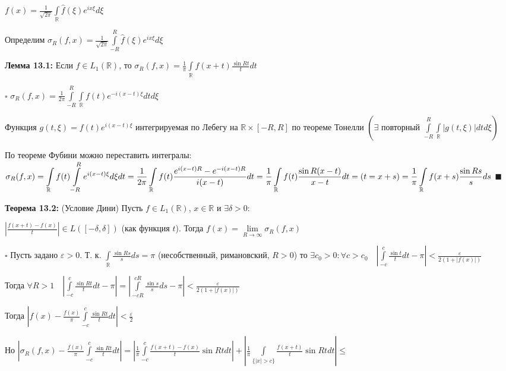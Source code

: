 \documentclass[a4paper]{report}
\newcommand*{\hm}[1]{#1\nobreak\discretionary{}%
            {\hbox{$\mathsurround=0pt #1$}}{}}
\begin{document}
$f(x)=\displaystyle\frac1{\sqrt{2\pi}}\displaystyle\int\limits_{\mathbb R}\hat f(\xi)e^{ix\xi}d\xi$
\bigskip

Определим $\sigma_R(f,x)=\displaystyle\frac{1}{\sqrt{2\pi}}\displaystyle\int\limits_{-R}^R\hat f(\xi)e^{ix\xi}d\xi$

\noindent\textbf{Лемма 13.1:} Если $f\in L_1(\mathbb R)$, то $\sigma_R(f,x)=\displaystyle\frac1\pi\displaystyle\int\limits_{\mathbb R}f(x+t)\frac{\sin Rt}{t}dt$

\noindent $\square$ $\sigma_R(f,x)=\displaystyle\frac1{2\pi}\displaystyle\int\limits_{-R}^R\displaystyle\int\limits_{\mathbb R}f(t)e^{-i(x-t)\xi}dtd\xi$

Функция $g(t,\xi)=f(t)e^{i(x-t)\xi}$ интегрируемая по Лебегу на $\mathbb R\times[-R,R]$ по теореме Тонелли $\left(\exists\text{ повторный }\displaystyle\int\limits_{-R}^R\displaystyle\int\limits_{\mathbb R}|g(t,\xi)|dtd\xi\right)$

По теореме Фубини можно переставить интегралы: $\sigma_R(f,x)=\displaystyle\int\limits_{\mathbb R}f(t)\displaystyle\int\limits_{-R}^R e^{i(x-t)\xi}d\xi dt\hm=\frac1{2\pi}\displaystyle\int\limits_{\mathbb R}f(t)\frac{e^{i(x-t)R}-e^{-i(x-t)R}}{i(x-t)}dt=\frac1\pi\displaystyle\int\limits_{\mathbb R}f(t)\frac{\sin R(x-t)}{x-t}dt=(t=x+s)\hm=\frac1\pi\displaystyle\int\limits_{\mathbb R}f(x+s)\frac{\sin Rs}{s}ds$ $\blacksquare$
\bigskip

\noindent\textbf{Теорема 13.2:} (Условие Дини) Пусть $f\in L_1(\mathbb R)$, $x\in\mathbb R$ и $\exists\delta>0\colon$ 

$\left|\displaystyle\frac{f(x+t)-f(x)}{t}\right|\in L([-\delta,\delta])$ (как функция $t$). Тогда $f(x)=\lim\limits_{R\to\infty}\sigma_R(f,x)$

\noindent $\square$ Пусть задано $\varepsilon>0$. Т. к. $\displaystyle\int\limits_{\mathbb R}\frac{\sin Rs}{s}ds=\pi$ (несобственный, римановский, $R>0$) то $\exists c_0>0\colon\forall c>c_0\quad\left|\displaystyle\int\limits_{-c}^c\frac{\sin t}{t}dt-\pi\right|<\displaystyle\frac{\varepsilon}{2(1+|f(x)|)}$

Тогда $\forall R>1\quad\left|\displaystyle\int\limits_{-c}^c\displaystyle\frac{\sin Rt}{t}dt-\pi\right|=\left|\displaystyle\int\limits_{-cR}^{cR}\frac{\sin s}{s}ds-\pi\right|<\displaystyle\frac{\varepsilon}{2(1+|f(x)|)}$

Тогда $\left|f(x)-\displaystyle\frac{f(x)}{\pi}\displaystyle\int\limits_{-c}^c\frac{\sin Rt}{t}dt\right|<\displaystyle\frac\varepsilon2$

Но $\left|\sigma_R(f,x)-\displaystyle\frac{f(x)}{\pi}\displaystyle\int\limits_{-c}^c\frac{\sin Rt}{t}dt\right|=\left|\displaystyle\frac1\pi\displaystyle\int\limits_{-c}^c\frac{f(x+t)-f(x)}{t}\sin Rtdt\right|+\left|\displaystyle\frac1\pi\displaystyle\int\limits_{\{|x|>c\}}\frac{f(x+t)}{t}\sin Rtdt\right|\le$
\end{document}
